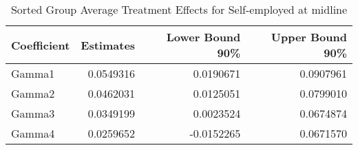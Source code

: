 \begin{table}

\caption{\label{tab:gatesRselfempl}Sorted Group Average Treatment Effects for Self-employed at midline}
\centering
\begin{tabular}[t]{lrrr}
\toprule
Coefficient & Estimates & Lower Bound 90\% & Upper Bound 90\%\\
\midrule
Gamma1 & 0.0549316 & 0.0190671 & 0.0907961\\
Gamma2 & 0.0462031 & 0.0125051 & 0.0799010\\
Gamma3 & 0.0349199 & 0.0023524 & 0.0674874\\
Gamma4 & 0.0259652 & -0.0152265 & 0.0671570\\
\bottomrule
\end{tabular}
\end{table}
